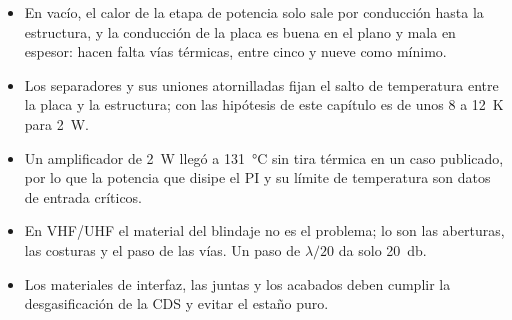 \begin{itemize}
  \item En vacío, el calor de la etapa de potencia solo sale por conducción hasta la estructura, y la conducción de la placa es buena en el plano y mala en espesor: hacen falta vías térmicas, entre cinco y nueve como mínimo.
  \item Los separadores y sus uniones atornilladas fijan el salto de temperatura entre la placa y la estructura; con las hipótesis de este capítulo es de unos \num{8} a \SI{12}{\kelvin} para \SI{2}{\watt}.
  \item Un amplificador de \SI{2}{\watt} llegó a \SI{131}{\celsius} sin tira térmica en un caso publicado, por lo que la potencia que disipe el PI y su límite de temperatura son datos de entrada críticos.
  \item En VHF/UHF el material del blindaje no es el problema; lo son las aberturas, las costuras y el paso de las vías. Un paso de $\lambda/20$ da solo \SI{20}{\decibel}.
  \item Los materiales de interfaz, las juntas y los acabados deben cumplir la desgasificación de la CDS y evitar el estaño puro.
\end{itemize}
